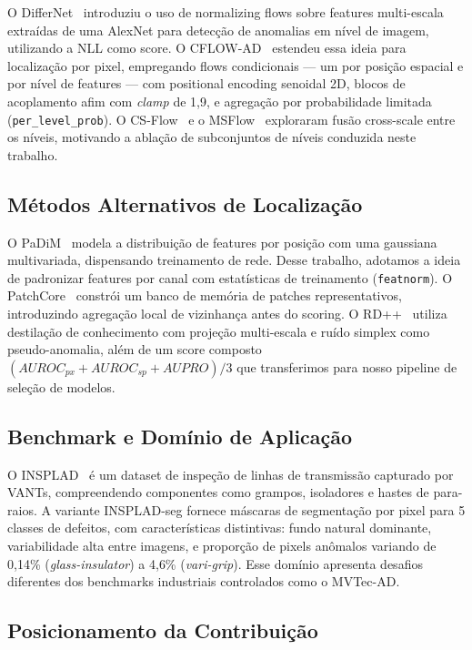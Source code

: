 \documentclass[conference]{IEEEtran}
\begin{document}
O DifferNet~\cite{rudolph2021differnet} introduziu o uso de normalizing flows sobre features multi-escala extraídas de uma AlexNet para detecção de anomalias em nível de imagem, utilizando a NLL como score. O CFLOW-AD~\cite{gudovskiy2022cflow} estendeu essa ideia para localização por pixel, empregando flows condicionais --- um por posição espacial e por nível de features --- com positional encoding senoidal 2D, blocos de acoplamento afim com \textit{clamp} de 1{,}9, e agregação por probabilidade limitada (\texttt{per\_level\_prob}). O CS-Flow~\cite{rudolph2022csflow} e o MSFlow~\cite{zhou2024msflow} exploraram fusão cross-scale entre os níveis, motivando a ablação de subconjuntos de níveis conduzida neste trabalho.

\subsection{Métodos Alternativos de Localização}

O PaDiM~\cite{defard2021padim} modela a distribuição de features por posição com uma gaussiana multivariada, dispensando treinamento de rede. Desse trabalho, adotamos a ideia de padronizar features por canal com estatísticas de treinamento (\texttt{featnorm}). O PatchCore~\cite{roth2022patchcore} constrói um banco de memória de patches representativos, introduzindo agregação local de vizinhança antes do scoring. O RD++~\cite{deng2022rd} utiliza destilação de conhecimento com projeção multi-escala e ruído simplex como pseudo-anomalia, além de um score composto $(AUROC_{px} + AUROC_{sp} + AUPRO)/3$ que transferimos para nosso pipeline de seleção de modelos.

\subsection{Benchmark e Domínio de Aplicação}

O INSPLAD~\cite{vieira2023insplad} é um dataset de inspeção de linhas de transmissão capturado por VANTs, compreendendo componentes como grampos, isoladores e hastes de para-raios. A variante INSPLAD-seg fornece máscaras de segmentação por pixel para 5 classes de defeitos, com características distintivas: fundo natural dominante, variabilidade alta entre imagens, e proporção de pixels anômalos variando de 0{,}14\% (\textit{glass-insulator}) a 4{,}6\% (\textit{vari-grip}). Esse domínio apresenta desafios diferentes dos benchmarks industriais controlados como o MVTec-AD.

\subsection{Posicionamento da Contribuição}
\end{document}
